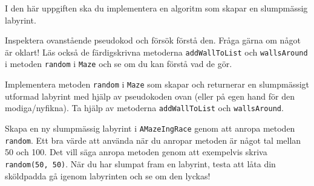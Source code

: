 



\Task I den här uppgiften ska du implementera en algoritm som skapar en slumpmässig labyrint.

\Subtask Inspektera ovanstående pseudokod och försök förstå den. Fråga gärna om något är oklart! Läs också de färdigskrivna metoderna \texttt{addWallToList} och \texttt{wallsAround} i metoden \texttt{random} i \texttt{Maze} och se om du kan förstå vad de gör.

\Subtask Implementera metoden \texttt{random} i \texttt{Maze} som skapar och returnerar en slumpmässigt utformad labyrint med hjälp av pseudokoden ovan (eller på egen hand för den modiga/nyfikna). Ta hjälp av metoderna \texttt{addWallToList} och \texttt{wallsAround}.

\Subtask Skapa en ny slumpmässig labyrint i \texttt{AMazeIngRace} genom att anropa metoden \texttt{random}. Ett bra värde att använda när du anropar metoden är något tal mellan 50 och 100. Det vill säga anropa metoden genom att exempelvis skriva \texttt{random(50, 50)}. När du har slumpat fram en labyrint, testa att låta din sköldpadda gå igenom labyrinten och se om den lyckas!

